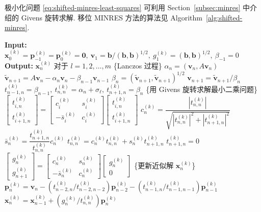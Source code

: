{极小化问题 \eqref{eq:shifted-minres-least-squares} 可利用 Section\ \ref{subsec:minres} 中介绍的 Givens 旋转求解. 移位 MINRES 方法的算法见 Algorithm\ \ref{alg:shifted-minres}.}
\begin{algorithm}[H]\caption{{移位 MINRES 方法}}\label{alg:shifted-minres}\begin{algorithmic}[1]
\Statex\textbf{Input:} $\bm x_0^{(k)}=\bm p_{-1}^{(k)}=\bm p_0^{(k)}=\bm0,\ \bm v_1=\bm b/(\bm b,\bm b)^{1/2},\ g_1^{(k)}=(\bm b,\bm b)^{1/2},\ \beta_{-1}=0$
\Statex\textbf{Output:} $\bm x_n^{(k)}$ {对于} $l=1,2,\ldots,m$
\State \{{Lanczos 过程}\}
\State $\alpha_n=(\bm v_n,A\bm v_n)$
\State $\widetilde{\bm v}_{n+1}=A\bm v_n-\alpha_n\bm v_n-\beta_{n-1}\bm v_{n-1}$
\State $\beta_n=(\widetilde{\bm v}_{n+1},\widetilde{\bm v}_{n+1})^{1/2}$
\State $\bm v_{n+1}=\widetilde{\bm v}_{n+1}/\beta_n$
\State $t_{n-1,n}^{(k)}=\beta_{n-1},\ t_{n,n}^{(k)}=\alpha_n+\sigma_{\ell},\ t_{n+1,n}^{(k)}=\beta_n$
\State \{{用 Givens 旋转求解最小二乘问题}\}
\State $\begin{bmatrix}t_{i,n}^{(k)}\\t_{i+1,n}^{(k)}\end{bmatrix}=\begin{bmatrix}c_i^{(k)}&s_i^{(k)}\\-\bar s_i^{(k)}&c_i^{(k)}\end{bmatrix}\begin{bmatrix}t_{i,n}^{(k)}\\t_{i+1,n}^{(k)}\end{bmatrix}$
\EndFor
\State $c_n^{(k)}=\dfrac{|t_{n,n}^{(k)}|}{\sqrt{|t_{n,n}^{(k)}|^2+|t_{n+1,n}^{(k)}|^2}}$
\State $\bar s_n^{(k)}=\dfrac{t_{n+1,n}^{(k)}}{t_{n,n}^{(k)}}c_n^{(k)}$
\State $t_{n,n}^{(k)}=c_n^{(k)}t_{n,n}^{(k)}+s_n^{(k)}t_{n+1,n}^{(k)}$
\State $t_{n+1,n}^{(k)}=0$
\State $\begin{bmatrix}g_n^{(k)}\\g_{n+1}^{(k)}\end{bmatrix}=\begin{bmatrix}c_n^{(k)}&s_n^{(k)}\\-\bar s_n^{(k)}&c_n^{(k)}\end{bmatrix}\begin{bmatrix}g_n^{(k)}\\0\end{bmatrix}$
\State \{{更新近似解 $\bm x_n^{(k)}$}\}
\State $\bm p_n^{(k)}=\bm v_n-(t_{n-2,n}^{(k)}/t_{n-2,n-2}^{(k)})\bm p_{n-2}^{(k)}-(t_{n-1,n}^{(k)}/t_{n-1,n-1}^{(k)})\bm p_{n-1}^{(k)}$
\State $\bm x_n^{(k)}=\bm x_{n-1}^{(k)}+(g_n^{(k)}/t_{n,n}^{(k)})\bm p_n^{(k)}$
\EndIf\EndFor
{}
\EndFor\end{algorithmic}\end{algorithm}
